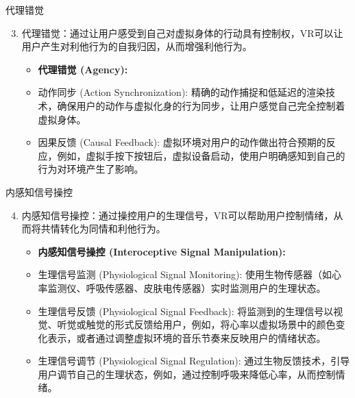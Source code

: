 \documentclass[aspectratio=169,xcolor=dvipsnames]{beamer}
\begin{document}
\begin{frame}{代理错觉}
    \begin{enumerate}
        \setcounter{enumi}{2}
        \item 代理错觉：通过让用户感受到自己对虚拟身体的行动具有控制权，VR可以让用户产生对利他行为的自我归因，从而增强利他行为。
        \begin{itemize}
            \item \textbf{代理错觉 (Agency):}
            \item 动作同步 (Action Synchronization): 精确的动作捕捉和低延迟的渲染技术，确保用户的动作与虚拟化身的行为同步，让用户感觉自己完全控制着虚拟身体。
            \item 因果反馈 (Causal Feedback): 虚拟环境对用户的动作做出符合预期的反应，例如，虚拟手按下按钮后，虚拟设备启动，使用户明确感知到自己的行为对环境产生了影响。
        \end{itemize}
    \end{enumerate}
\end{frame}

\begin{frame}{内感知信号操控}
    \begin{enumerate}
        \setcounter{enumi}{3}
        \item 内感知信号操控：通过操控用户的生理信号，VR可以帮助用户控制情绪，从而将共情转化为同情和利他行为。
        \begin{itemize}
            \item \textbf{内感知信号操控 (Interoceptive Signal Manipulation):}
            \item 生理信号监测 (Physiological Signal Monitoring): 使用生物传感器（如心率监测仪、呼吸传感器、皮肤电传感器）实时监测用户的生理状态。
            \item 生理信号反馈 (Physiological Signal Feedback): 将监测到的生理信号以视觉、听觉或触觉的形式反馈给用户，例如，将心率以虚拟场景中的颜色变化表示，或者通过调整虚拟环境的音乐节奏来反映用户的情绪状态。
            \item 生理信号调节 (Physiological Signal Regulation): 通过生物反馈技术，引导用户调节自己的生理状态，例如，通过控制呼吸来降低心率，从而控制情绪。
        \end{itemize}
    \end{enumerate}
\end{frame}
\end{document}

